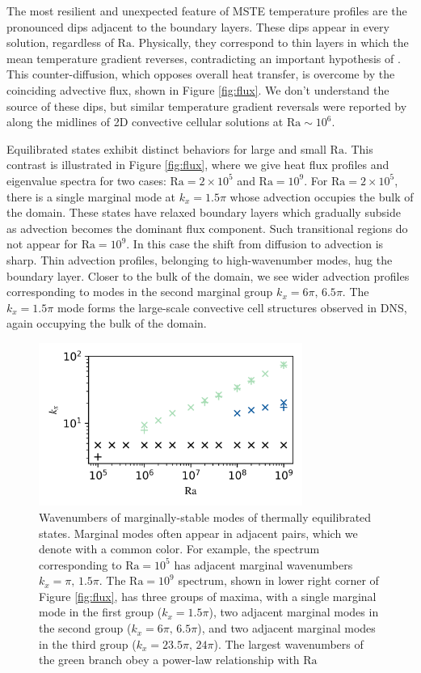 \documentclass[reprint,amsmath,amssymb,aps]{revtex4-1}
\newcommand\Ra{\mathrm{Ra}}
\begin{document}
The most resilient and unexpected feature of MSTE temperature profiles are the pronounced dips adjacent to the boundary layers. 
These dips appear in every solution, regardless of $\Ra$. 
Physically, they correspond to thin layers in which the mean temperature gradient reverses, contradicting an important hypothesis of \cite{Malkus_1954,Howard_1966}. 
This counter-diffusion, which opposes overall heat transfer, is overcome by the coinciding advective flux, shown in Figure \ref{fig:flux}. 
We don't understand the source of these dips, but similar temperature gradient reversals were reported by \cite{chini_cells} along the midlines of 2D convective cellular solutions at $\Ra \sim 10^6$. 

Equilibrated states exhibit distinct behaviors for large and small $\Ra$. 
This contrast is illustrated in Figure \ref{fig:flux}, where we give heat flux profiles and eigenvalue spectra for two cases: $\Ra = 2 \times 10^5$ and $\Ra = 10^9$. 
For $\Ra = 2 \times 10^5$, there is a single marginal mode at $k_x = 1.5\pi$ whose advection occupies the bulk of the domain. 
These states have relaxed boundary layers which gradually subside as advection becomes the dominant flux component. 
Such transitional regions do not appear for $\Ra = 10^9$. In this case the shift from diffusion to advection is sharp. Thin advection profiles, belonging to high-wavenumber modes, hug the boundary layer. 
Closer to the bulk of the domain, we see wider advection profiles corresponding to modes in the second marginal group $k_x = 6\pi, \, 6.5\pi$. The $k_x = 1.5\pi$ mode forms the large-scale convective cell structures observed in DNS, again occupying the bulk of the domain.

\begin{figure}
    \centering
    \includegraphics[width=3.4in]{kx_m_ra1.png}
    \caption{Wavenumbers of marginally-stable modes of thermally equilibrated states. 
    Marginal modes often appear in adjacent pairs, which we denote with a common color. 
    For example, the spectrum corresponding to $\Ra = 10^5$ has adjacent marginal wavenumbers $k_x = \pi, \, 1.5\pi$. 
    The $\Ra = 10^9$ spectrum, shown in lower right corner of Figure \ref{fig:flux}, has three groups of maxima, with a single marginal mode in the first group ($k_x = 1.5\pi$), two adjacent marginal modes in the second group ($k_x = 6\pi, \, 6.5\pi$), and two adjacent marginal modes in the third group ($k_x = 23.5\pi, \, 24\pi$). 
    The largest wavenumbers of the green branch obey a power-law relationship with $\Ra$}
    \label{fig:kx_marginals}
\end{figure}
\end{document}
